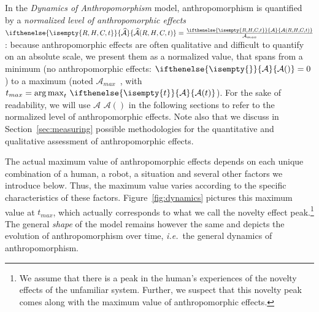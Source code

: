 \documentclass{frontiersSCNS} %
\newcommand{\ie}{{\textit{i.e.~}}}
\newcommand{\Ant}[1][]{%
      \ifthenelse{\isempty{#1}}%
        {$\mathcal{A}$}
        {$\mathcal{A}(#1)$}
}
\newcommand{\ant}[1][]{%
      \ifthenelse{\isempty{#1}}%
        {\mathcal{A}}
        {\mathcal{A}(#1)}
}
\newcommand{\antNorm}[1][]{%
      \ifthenelse{\isempty{#1}}%
      {\widehat{\mathcal{A}}}
      {\widehat{\mathcal{A}}(#1)}
}
\newcommand{\AntMax}{{$\mathcal{A}_{max}$~}}
\newcommand{\antMax}{{\mathcal{A}_{max}}}
\begin{document}
In the \emph{Dynamics of Anthropomorphism} model, anthropomorphism is quantified by a \emph{normalized level of
anthropomorphic effects} $\antNorm[R,H,C,t] = \frac{\ant[R,H,C,t]}{\antMax}$:
because anthropomorphic effects are often qualitative and difficult to quantify
on an absolute scale, we present them as a normalized value, that spans from a
minimum (no anthropomorphic effects: $\ant=0$) to a maximum (noted \AntMax, with
$t_{max} = \operatorname{arg\,max}_t \, \ant[t]$). For the sake of readability,
we will use \Ant in the following sections to refer to the normalized level of
anthropomorphic effects. Note also that we discuss in
Section~\ref{sec:measuring} possible methodologies for the quantitative and
qualitative assessment of anthropomorphic effects.

The actual maximum value of anthropomorphic effects depends on each unique
combination of a human, a robot, a situation and several other factors we introduce below. Thus, the maximum value varies according to the specific characteristics of these factors. Figure~\ref{fig:dynamics} pictures this maximum value at
$t_{max}$, which actually corresponds to what we call the novelty effect peak.\footnote{We assume that there is a peak in the human's experiences of the novelty effects of the unfamiliar system. Further, we suspect that this novelty peak comes along with the maximum value of anthropomorphic effects.} 
 The general
\emph{shape} of the model remains however the same and depicts the evolution of
anthropomorphism over time, \ie the general dynamics of anthropomorphism.
\end{document}
